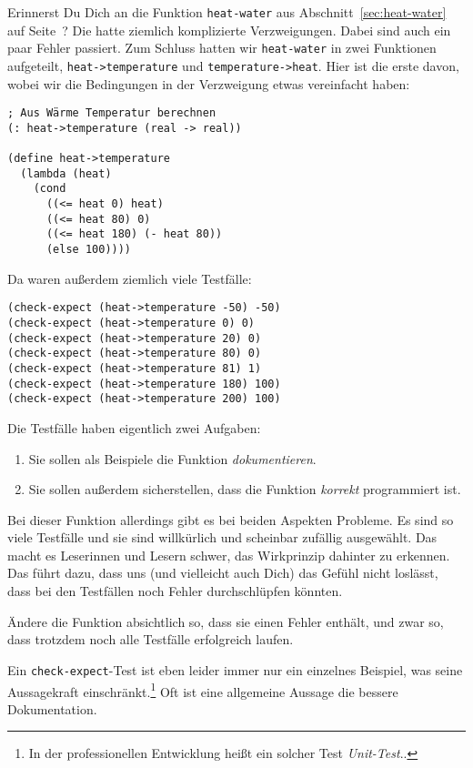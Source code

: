 %
Erinnerst Du Dich an die Funktion \lstinline{heat-water} aus
Abschnitt~\ref{sec:heat-water} auf Seite~\pageref{sec:heat-water}?
Die hatte ziemlich komplizierte Verzweigungen.  Dabei sind auch ein
paar Fehler passiert.  Zum Schluss hatten wir \lstinline{heat-water}
in zwei Funktionen aufgeteilt, \lstinline{heat->temperature} und
\lstinline{temperature->heat}.  Hier ist die erste davon, wobei wir
die Bedingungen in der Verzweigung etwas vereinfacht haben:
%
\begin{lstlisting}
; Aus Wärme Temperatur berechnen
(: heat->temperature (real -> real))

(define heat->temperature
  (lambda (heat)
    (cond
      ((<= heat 0) heat)
      ((<= heat 80) 0)
      ((<= heat 180) (- heat 80))
      (else 100))))
\end{lstlisting}
%
Da waren außerdem ziemlich viele Testfälle:
%
\begin{lstlisting}
(check-expect (heat->temperature -50) -50)
(check-expect (heat->temperature 0) 0)
(check-expect (heat->temperature 20) 0)
(check-expect (heat->temperature 80) 0)
(check-expect (heat->temperature 81) 1)
(check-expect (heat->temperature 180) 100)
(check-expect (heat->temperature 200) 100)                                            
\end{lstlisting}
%
Die Testfälle haben eigentlich zwei Aufgaben:
%
\begin{enumerate}
\item Sie sollen als Beispiele die Funktion \emph{dokumentieren}.
\item Sie sollen außerdem sicherstellen, dass die Funktion
  \emph{korrekt} programmiert ist.
\end{enumerate}
%
Bei dieser Funktion allerdings gibt es bei beiden Aspekten Probleme.
Es sind so viele Testfälle und sie sind willkürlich und scheinbar
zufällig ausgewählt.  Das macht es Leserinnen und Lesern schwer, das
Wirkprinzip dahinter zu erkennen. Das führt dazu, dass uns (und
vielleicht auch Dich) das Gefühl nicht loslässt, dass bei den
Testfällen noch Fehler durchschlüpfen könnten.
%
\begin{aufgabeinline}
  Ändere die Funktion absichtlich so, dass sie einen Fehler enthält,
  und zwar so, dass trotzdem noch alle Testfälle erfolgreich laufen.  
\end{aufgabeinline}
%
Ein \lstinline{check-expect}-Test ist eben leider immer nur ein
einzelnes Beispiel, was seine Aussagekraft einschränkt.\footnote{In
  der professionellen Entwicklung heißt ein solcher Test
  \textit{Unit-Test}..}  Oft ist eine allgemeine
Aussage die bessere Dokumentation.

